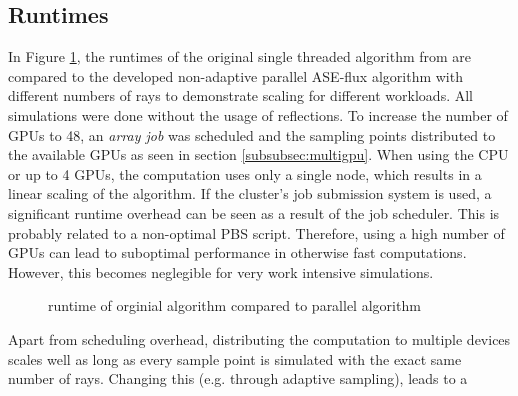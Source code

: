 \subsection{Runtimes}
In Figure \ref{plot:runtime}, the runtimes of the original single threaded
algorithm from \cite{ASE2010} are compared to the developed non-adaptive
parallel ASE-flux algorithm with different numbers of rays to demonstrate
scaling for different workloads. All simulations were done without the usage
of reflections. To increase the number of GPUs to 48, an
\emph{array job} was scheduled and the sampling points distributed to the
available GPUs as seen in section \ref{subsubsec:multigpu}.  When using the CPU
or up to 4 GPUs, the computation uses only a single node, which results in a
linear scaling of the algorithm. If the cluster's job submission system is used,
a significant runtime overhead can be seen as a result of the job scheduler.
This is probably related to a non-optimal PBS script. Therefore, using a high
number of GPUs can lead to suboptimal performance in otherwise fast
computations. However, this becomes neglegible for very work intensive
simulations.
\begin{figure}[H]
  \centerline{
    }
  \caption{runtime of orginial algorithm compared to parallel algorithm}
  \label{plot:runtime}
\end{figure}
Apart from scheduling overhead, distributing the computation to multiple devices
scales well as long as every sample point is simulated with the exact same
number of rays. Changing this (e.g. through adaptive sampling), leads to a
